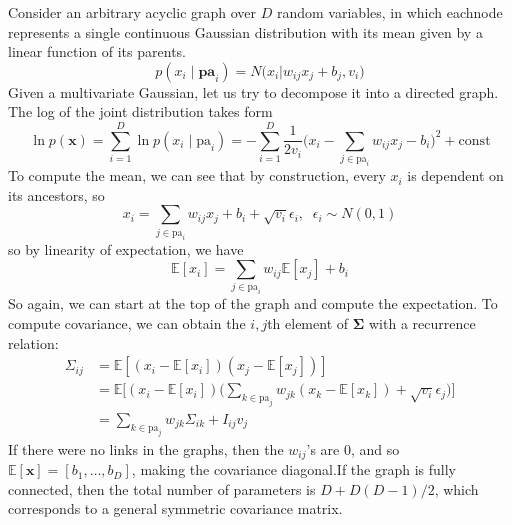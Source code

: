 \documentclass{article}
\begin{document}
  \begin{example}
    Consider an arbitrary acyclic graph over $D$ random variables, in which eachnode represents a single continuous Gaussian distribution with its mean given by a linear function of its parents. 
    \[p(x_i \mid \mathbf{pa}_i) = N \bigg( x_i \bigg| w_{ij} x_j + b_j, v_i \bigg) \]
    Given a multivariate Gaussian, let us try to decompose it into a directed graph. The log of the joint distribution takes form 
    \[\ln p(\mathbf{x}) = \sum_{i=1}^D \ln p(x_i \mid \mathrm{pa}_i) = - \sum_{i=1}^D \frac{1}{2 v_i} \bigg( x_i - \sum_{j \in \mathrm{pa}_i} w_{ij} x_j - b_i \bigg)^2 + \mathrm{const}\]
    To compute the mean, we can see that by construction, every $x_i$ is dependent on its ancestors, so 
    \[x_i = \sum_{j \in \mathrm{pa}_i} w_{ij} x_j + b_i + \sqrt{v_i} \epsilon_i, \;\; \epsilon_i \sim N(0, 1)\]
    so by linearity of expectation, we have 
    \[\mathbb{E}[x_i] = \sum_{j \in \mathrm{pa}_i} w_{ij} \mathbb{E}[x_j] + b_i\]
    So again, we can start at the top of the graph and compute the expectation. To compute covariance, we can obtain the $i, j$th element of $\boldsymbol{\Sigma}$ with a recurrence relation: 
    \begin{align*} 
      \Sigma_{ij} & = \mathbb{E}[ (x_i - \mathbb{E}[x_i]) (x_j - \mathbb{E}[x_j])] \\
                  & = \mathbb{E} \bigg[ (x_i - \mathbb{E}[x_i]) \bigg( \sum_{k \in \mathrm{pa}_j} w_{j k} (x_k - \mathbb{E}[x_k])  + \sqrt{v_i} \epsilon_j\bigg) \bigg] \\
                  & = \sum_{k \in \mathrm{pa}_j} w_{j k} \Sigma_{ik} + I_{ij} v_j
    \end{align*}
    If there were no links in the graphs, then the $w_{ij}$'s are $0$, and so $\mathbb{E}[\mathbf{x}] = [b_1, \ldots, b_D]$, making the covariance diagonal.If the graph is fully connected, then the total number of parameters is $D + D(D-1)/2$, which corresponds to a general symmetric covariance matrix.  
  \end{example}
\end{document}
